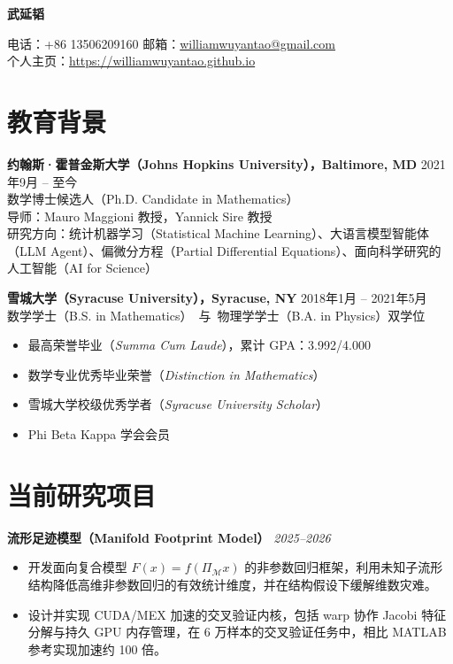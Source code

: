 \documentclass[11pt]{ctexart}
\newcommand{\entry}[4]{%
\textbf{#1} \hfill {#2}\\
#3\\
#4\par
}
\newcommand{\proj}[2]{%
\Needspace{4\baselineskip}%
\textbf{#1} \hfill {\em #2}\par
}
\begin{document}
\begin{center}
{\LARGE\bfseries 武延韬}\par
\vspace{4pt}
电话：+86 13506209160 \quad 邮箱：\href{mailto:williamwuyantao@gmail.com}{williamwuyantao@gmail.com} \\ 个人主页：\href{https://williamwuyantao.github.io/}{https://williamwuyantao.github.io}
\end{center}

\section*{教育背景}

\entry{约翰斯·霍普金斯大学（Johns Hopkins University），Baltimore, MD}{2021年9月 -- 至今}
{数学博士候选人（Ph.D. Candidate in Mathematics）}
{导师：Mauro Maggioni 教授，Yannick Sire 教授\\
研究方向：统计机器学习（Statistical Machine Learning）、大语言模型智能体（LLM Agent）、偏微分方程（Partial Differential Equations）、面向科学研究的人工智能（AI for Science）}

\entry{雪城大学（Syracuse University），Syracuse, NY}{2018年1月 -- 2021年5月}
{数学学士（B.S. in Mathematics）\ 与\ 物理学学士（B.A. in Physics）双学位}
{\vspace{-15pt}
\begin{itemize}
    \item 最高荣誉毕业（\textit{Summa Cum Laude}），累计 GPA：3.992/4.000
    \item 数学专业优秀毕业荣誉（\textit{Distinction in Mathematics}）
    \item 雪城大学校级优秀学者（\textit{Syracuse University Scholar}）
    \item Phi Beta Kappa 学会会员
\end{itemize}
}

\section*{当前研究项目}

\proj{流形足迹模型（Manifold Footprint Model）}{2025--2026}
\begin{itemize}[leftmargin=1.2em, itemsep=-2pt]
  \item 开发面向复合模型 $F(x)=f(\Pi_{\mathcal{M}}x)$ 的非参数回归框架，利用未知子流形结构降低高维非参数回归的有效统计维度，并在结构假设下缓解维数灾难。
  \item 设计并实现 CUDA/MEX 加速的交叉验证内核，包括 warp 协作 Jacobi 特征分解与持久 GPU 内存管理，在 6 万样本的交叉验证任务中，相比 MATLAB 参考实现加速约 100 倍。
\end{itemize}
\end{document}
